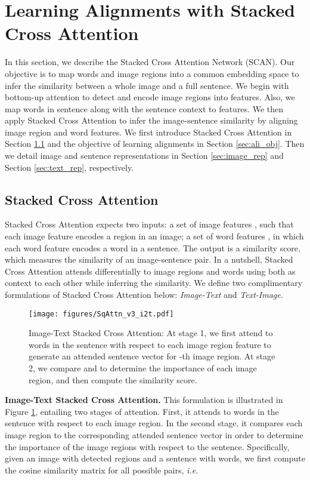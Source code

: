 \documentclass[runningheads]{llncs}
\begin{document}
\section{Learning Alignments with Stacked Cross Attention}

In this section, we describe the Stacked Cross Attention Network (SCAN). Our objective is to map words and image regions into a common embedding space to infer the similarity between a whole image and a full sentence. We begin with bottom-up attention to detect and encode image regions into features. Also, we map words in sentence along with the sentence context to features. We then apply Stacked Cross Attention to infer the image-sentence similarity by aligning image region and word features. We first introduce Stacked Cross Attention in Section \ref{sec:sq_attn} and the objective of learning alignments in Section \ref{sec:ali_obj}. Then we detail image and sentence representations in Section \ref{sec:image_rep} and Section \ref{sec:text_rep}, respectively.

\subsection{Stacked Cross Attention}
\label{sec:sq_attn}
Stacked Cross Attention expects two inputs: a set of image features , such that each image feature encodes a region in an image; a set of word features , in which each word feature encodes a word in a sentence. The output is a similarity score, which measures the similarity of an image-sentence pair. In a nutshell, Stacked Cross Attention attends differentially to image regions and words using both as context to each other while inferring the similarity. We define two complimentary formulations of Stacked Cross Attention below: \textit{Image-Text} and \textit{Text-Image}.

\begin{figure}[t]
\centering
\texttt{[image: figures/SqAttn\_v3\_i2t.pdf]}
\caption{Image-Text Stacked Cross Attention: At stage 1, we first attend to words in the sentence with respect to each image region feature  to generate an attended sentence vector  for -th image region. At stage 2, we compare  and  to determine the importance of each image region, and then compute the similarity score.}
\label{fig:sqattn_i2t}
\end{figure}

\noindent
\textbf{Image-Text Stacked Cross Attention.} This formulation is illustrated in Figure \ref{fig:sqattn_i2t}, entailing two stages of attention. First, it attends to words in the sentence with respect to each image region. In the second stage, it compares each image region to the corresponding attended sentence vector in order to determine the importance of the image regions with respect to the sentence. Specifically, given an image  with  detected regions and a sentence  with  words, we first compute the cosine similarity matrix for all possible pairs, {\em i.e.}
\end{document}
